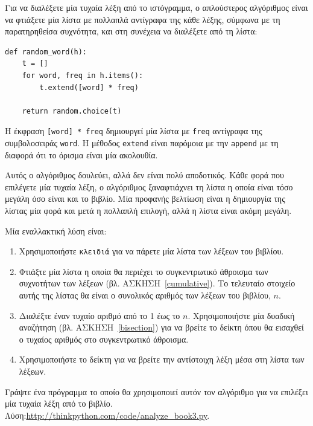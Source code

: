 \documentclass[10pt]{book}
\begin{document}
Για να διαλέξετε μία τυχαία λέξη από το ιστόγραμμα, ο απλούστερος αλγόριθμος είναι να φτιάξετε μία λίστα με πολλαπλά αντίγραφα της κάθε λέξης, σύμφωνα με τη παρατηρηθείσα συχνότητα, και στη συνέχεια να διαλέξετε από τη λίστα:

\begin{verbatim}
def random_word(h):
    t = []
    for word, freq in h.items():
        t.extend([word] * freq)

    return random.choice(t)
\end{verbatim}
%
Η έκφραση {\tt [word] * freq} δημιουργεί μία λίστα με {\tt freq} αντίγραφα της συμβολοσειράς {\tt word}. Η μέθοδος {\tt extend} είναι παρόμοια με την {\tt append} με τη διαφορά ότι το όρισμα είναι μία ακολουθία.
\\
\begin{exercise}
\label{randhist}

Αυτός ο αλγόριθμος δουλεύει, αλλά δεν είναι πολύ αποδοτικός. Κάθε φορά που επιλέγετε μία 
τυχαία λέξη, ο αλγόριθμος ξαναφτιάχνει τη λίστα η οποία είναι τόσο μεγάλη όσο είναι και το βιβλίο. Μία προφανής βελτίωση είναι η δημιουργία της λίστας μία φορά και μετά η πολλαπλή επιλογή, αλλά η λίστα είναι ακόμη μεγάλη.

Μία εναλλακτική λύση είναι:

\begin{enumerate}

\item  Χρησιμοποιήστε {\tt κλειδιά} για να πάρετε μία λίστα των λέξεων του βιβλίου. 

\item  Φτιάξτε μία λίστα η οποία θα περιέχει το συγκεντρωτικό άθροισμα των συχνοτήτων των λέξεων (βλ. ΑΣΚΗΣΗ~\ref{cumulative}). Το τελευταίο στοιχείο αυτής της λίστας θα είναι ο συνολικός αριθμός των λέξεων του βιβλίου,   $n$.

\item  Διαλέξτε έναν τυχαίο αριθμό από το 1 έως το $n$. Χρησιμοποιήστε μία δυαδική αναζήτηση (βλ. ΑΣΚΗΣΗ~\ref{bisection}) για να βρείτε το δείκτη όπου θα εισαχθεί ο τυχαίος αριθμός στο συγκεντρωτικό άθροισμα. 

\item  Χρησιμοποιήστε το δείκτη για να βρείτε την αντίστοιχη λέξη μέσα στη λίστα των λέξεων. 

\end{enumerate}

Γράψτε ένα πρόγραμμα το οποίο θα χρησιμοποιεί αυτόν τον αλγόριθμο για να επιλέξει μία τυχαία λέξη από το βιβλίο. Λύση:\url{http://thinkpython.com/code/analyze_book3.py}.
\end{exercise}
\end{document}
